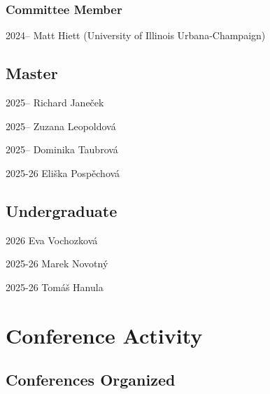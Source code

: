 \documentclass[12pt,a4paper]{report}
\begin{document}
    \subsubsection*{Committee Member}

    \begin{tablist}

        \item[2024--] \tab{}Matt Hiett (University of Illinois Urbana-Champaign)

    \end{tablist}

    \subsection*{Master}

    \begin{tablist}

        \item[2025--] \tab{}Richard Janeček
        \item[2025--] \tab{}Zuzana Leopoldová
        \item[2025--] \tab{}Dominika Taubrová
        \item[2025-26] \tab{}Eliška Pospěchová

    \end{tablist}

    \subsection*{Undergraduate}

    \begin{tablist}

        \item[2026] \tab{}Eva Vochozková
        \item[2025-26] \tab{}Marek Novotný
        \item[2025-26] \tab{}Tomáš Hanula

    \end{tablist}

    \section*{Conference Activity}


    \subsection*{Conferences Organized}
\end{document}
